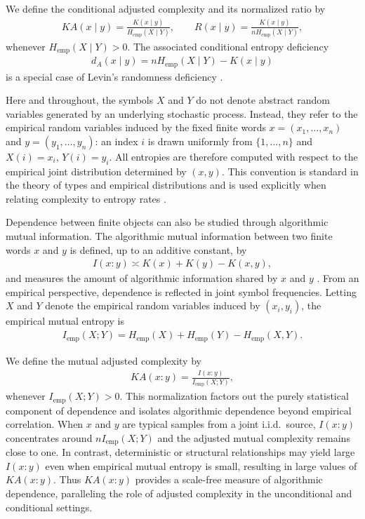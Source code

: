 \documentclass[12pt]{article}
\newcommand{\be}{\begin{eqnarray}}
\newcommand{\ee}{\end{eqnarray}}
\begin{document}
We define the conditional adjusted complexity and its normalized ratio by
\be
KA(x\mid y)=\frac{K(x\mid y)}{H_{\mathrm{emp}}(X\mid Y)},
\qquad
R(x\mid y)=\frac{K(x\mid y)}{nH_{\mathrm{emp}}(X\mid Y)},
\label{eq:conditional_defs}
\ee
whenever $H_{\mathrm{emp}}(X\mid Y)>0$. The associated conditional entropy
deficiency
\be
d_A(x\mid y)=nH_{\mathrm{emp}}(X\mid Y)-K(x\mid y)
\label{eq:conditional_deficiency}
\ee
is a special case of Levin’s randomness deficiency \citep{Levin1974}.

Here and throughout, the symbols $X$ and $Y$ do not denote abstract random
variables generated by an underlying stochastic process. Instead, they refer to
the empirical random variables induced by the fixed finite words
$x=(x_1,\dots,x_n)$ and $y=(y_1,\dots,y_n)$: an index $i$ is drawn uniformly from
$\{1,\dots,n\}$ and $X(i)=x_i$, $Y(i)=y_i$. All entropies are therefore computed
with respect to the empirical joint distribution determined by $(x,y)$. This
convention is standard in the theory of types and empirical distributions
\citep{CoverThomas2006} and is used explicitly when relating complexity to
entropy rates \citep{LiVitanyi2008}.

Dependence between finite objects can also be studied through algorithmic mutual
information. The algorithmic mutual information between two finite words $x$ and
$y$ is defined, up to an additive constant, by
\be
I(x:y) \asymp K(x)+K(y)-K(x,y),
\label{eq:alg_mutual_info}
\ee
and measures the amount of algorithmic information shared by $x$ and $y$
\citep{Kolmogorov1965,Levin1974,GacsTrompVitanyi2001}. From an empirical
perspective, dependence is reflected in joint symbol frequencies. Letting $X$
and $Y$ denote the empirical random variables induced by $(x_i,y_i)$, the
empirical mutual entropy is
\be
I_{\mathrm{emp}}(X;Y)
=
H_{\mathrm{emp}}(X)+H_{\mathrm{emp}}(Y)-H_{\mathrm{emp}}(X,Y).
\label{eq:emp_mutual_entropy}
\ee

We define the mutual adjusted complexity by
\be
KA(x:y)=\frac{I(x:y)}{I_{\mathrm{emp}}(X;Y)},
\label{eq:mutual_adjusted}
\ee
whenever $I_{\mathrm{emp}}(X;Y)>0$. This normalization factors out the purely
statistical component of dependence and isolates algorithmic dependence beyond
empirical correlation. When $x$ and $y$ are typical samples from a joint i.i.d.\
source, $I(x:y)$ concentrates around $nI_{\mathrm{emp}}(X;Y)$ and the adjusted
mutual complexity remains close to one. In contrast, deterministic or structural
relationships may yield large $I(x:y)$ even when empirical mutual entropy is
small, resulting in large values of $KA(x:y)$. Thus $KA(x:y)$ provides a
scale-free measure of algorithmic dependence, paralleling the role of adjusted
complexity in the unconditional and conditional settings.
\end{document}
